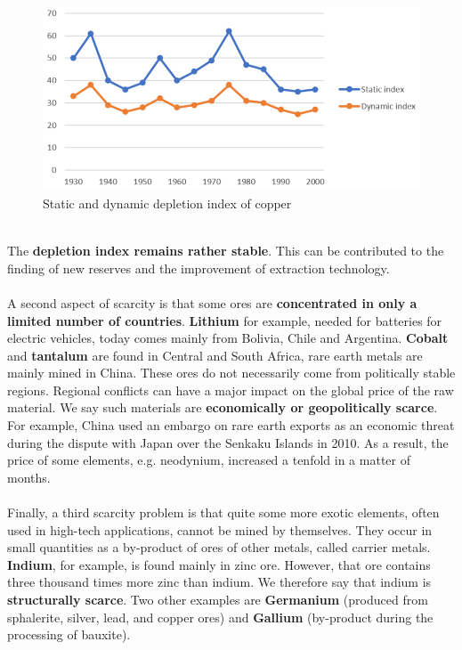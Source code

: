 \documentclass[../summary.tex]{subfiles}
\begin{document}
	\begin{figure}[H]
		\centering
		\includegraphics[width=0.7\linewidth]{../images/5-static-dynamic-index-copper}
		\caption{Static and dynamic depletion index of copper}
		\label{fig:5-static-dynamic-index-copper}
	\end{figure}
	
	\ \\
	The \textbf{depletion index remains rather stable}. This can be contributed to the finding of new reserves and the improvement of extraction technology.
	\\\\
	A second aspect of scarcity is that some ores are \textbf{concentrated in only a limited number of countries}. \textbf{Lithium} for example, needed for batteries for electric vehicles, today comes mainly from Bolivia, Chile and Argentina. \textbf{Cobalt} and \textbf{tantalum} are found in Central and South Africa, rare earth metals are mainly mined in China. These ores do not necessarily come from politically stable regions. Regional conflicts can have a major impact on the global price of the raw material. We say such materials are \textbf{economically or geopolitically scarce}. For example, China used an embargo on rare earth exports as an economic threat during the dispute with Japan over the Senkaku Islands in 2010. As a result, the price of some elements, e.g. neodynium,  increased a tenfold in a matter of months.
	\\\\
	Finally, a third scarcity problem is that quite some more exotic elements, often used in high-tech applications, cannot be mined by themselves. They occur in small quantities as a by-product of ores of other metals, called carrier metals. \textbf{Indium}, for example, is found mainly in zinc ore. However, that ore contains three thousand times more zinc than indium. We therefore say that indium is \textbf{structurally scarce}. Two other examples are \textbf{Germanium} (produced from sphalerite, silver, lead, and copper ores) and \textbf{Gallium} (by-product during the processing of bauxite). 
	\newpage
\end{document}
